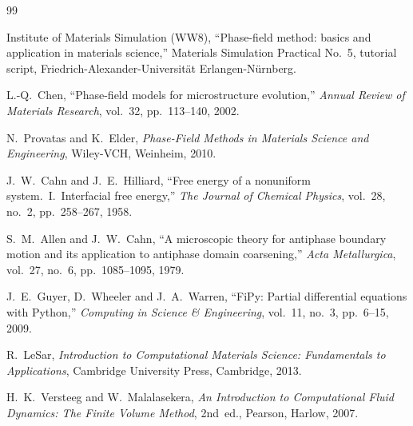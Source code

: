 \documentclass[11pt,a4paper]{article}
\numberwithin{equation}{section}
\theoremstyle{remark}
\begin{document}
\begin{thebibliography}{99}

Institute of Materials Simulation (WW8),
``Phase-field method: basics and application in materials science,''
Materials Simulation Practical No.~5, tutorial script,
Friedrich-Alexander-Universit\"at Erlangen-N\"urnberg.

L.-Q.~Chen,
``Phase-field models for microstructure evolution,''
\textit{Annual Review of Materials Research},
vol.~32, pp.~113--140, 2002.

N.~Provatas and K.~Elder,
\textit{Phase-Field Methods in Materials Science and Engineering},
Wiley-VCH, Weinheim, 2010.

J.~W.~Cahn and J.~E.~Hilliard,
``Free energy of a nonuniform system.~I.~Interfacial free energy,''
\textit{The Journal of Chemical Physics},
vol.~28, no.~2, pp.~258--267, 1958.

S.~M.~Allen and J.~W.~Cahn,
``A microscopic theory for antiphase boundary motion and its application to antiphase domain
coarsening,''
\textit{Acta Metallurgica},
vol.~27, no.~6, pp.~1085--1095, 1979.

J.~E.~Guyer, D.~Wheeler and J.~A.~Warren,
``FiPy: Partial differential equations with Python,''
\textit{Computing in Science \& Engineering},
vol.~11, no.~3, pp.~6--15, 2009.

R.~LeSar,
\textit{Introduction to Computational Materials Science: Fundamentals to Applications},
Cambridge University Press, Cambridge, 2013.

H.~K.~Versteeg and W.~Malalasekera,
\textit{An Introduction to Computational Fluid Dynamics: The Finite Volume Method},
2nd~ed., Pearson, Harlow, 2007.

\end{thebibliography}
\end{document}
